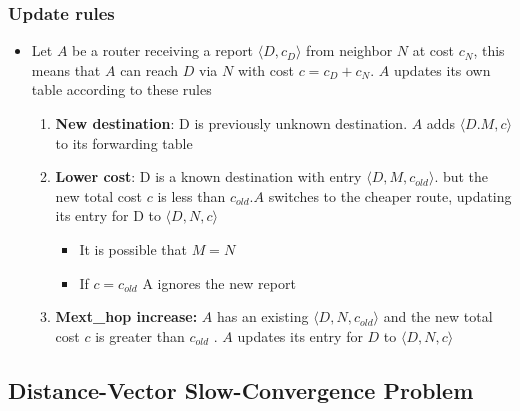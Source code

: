 \documentclass[11pt]{article}
\providecommand{\tightlist}{%
      \setlength{\itemsep}{0pt}\setlength{\parskip}{0pt}}
\begin{document}
    \subsubsection{Update rules}\label{update-rules}

\begin{itemize}
\tightlist
\item
  Let \(A\) be a router receiving a report \(\langle D, c_D \rangle\)
  from neighbor \(N\) at cost \(c_N\), this means that \(A\) can reach
  \(D\) via \(N\) with cost \(c=c_D+c_N\). \(A\) updates its own table
  according to these rules

  \begin{enumerate}
  \def\labelenumi{\arabic{enumi}.}
  \tightlist
  \item
    \textbf{New destination}: D is previously unknown destination. \(A\)
    adds \(\langle D. M, c \rangle\) to its forwarding table
  \item
    \textbf{Lower cost}: D is a known destination with entry
    \(\langle D,M,c_{old} \rangle\). but the new total cost \(c\) is
    less than \(c_{old}\).\(A\) switches to the cheaper route, updating
    its entry for D to \(\langle D,N,c \rangle\)

    \begin{itemize}
    \tightlist
    \item
      It is possible that \(M=N\)
    \item
      If \(c=c_{old}\) A ignores the new report
    \end{itemize}
  \item
    \textbf{Mext\_hop increase:} \(A\) has an existing
    \(\langle D,N,c_{old} \rangle\) and the new total cost \(c\) is
    greater than \(c_{old}\) . \(A\) updates its entry for \(D\) to
    \(\langle D,N,c \rangle\)
  \end{enumerate}
\end{itemize}

    \subsection{Distance-Vector Slow-Convergence
Problem}\label{distance-vector-slow-convergence-problem}
\end{document}
